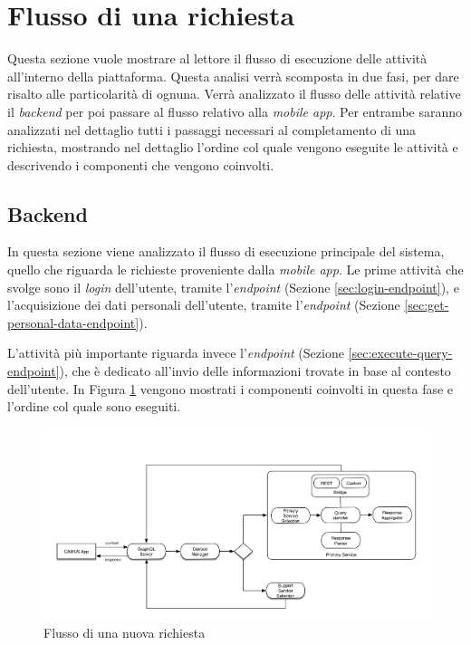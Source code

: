 \section{Flusso di una richiesta}

Questa sezione vuole mostrare al lettore il flusso di esecuzione delle attività all'interno della piattaforma. Questa analisi verrà scomposta in due fasi, per dare risalto alle particolarità di ognuna. Verrà analizzato il flusso delle attività relative il \emph{backend} per poi passare al flusso relativo alla \emph{mobile app}. Per entrambe saranno analizzati nel dettaglio tutti i passaggi necessari al completamento di una richiesta, mostrando nel dettaglio l'ordine col quale vengono eseguite le attività e descrivendo i componenti che vengono coinvolti.

\subsection{Backend\label{sec:flusso-richiesta-server}}

In questa sezione viene analizzato il flusso di esecuzione principale del sistema, quello che riguarda le richieste proveniente dalla \emph{mobile app}. Le prime attività che svolge sono il \emph{login} dell'utente, tramite l'\emph{endpoint}  (Sezione \ref{sec:login-endpoint}), e l'acquisizione dei dati personali dell'utente, tramite l'\emph{endpoint}  (Sezione \ref{sec:get-personal-data-endpoint}).

L'attività più importante riguarda invece l'\emph{endpoint}  (Sezione \ref{sec:execute-query-endpoint}), che è dedicato all'invio delle informazioni trovate in base al contesto dell'utente. In Figura \ref{fig:flusso-nuova-richiesta} vengono mostrati i componenti coinvolti in questa fase e l'ordine col quale sono eseguiti.

\begin{figure}[ht]
	\centering
	\includegraphics[width=\textwidth]{4-progettazione-alto-livello/Immagini/flusso-richiesta-backend.png}
	\caption{Flusso di una nuova richiesta\label{fig:flusso-nuova-richiesta}}
\end{figure}

